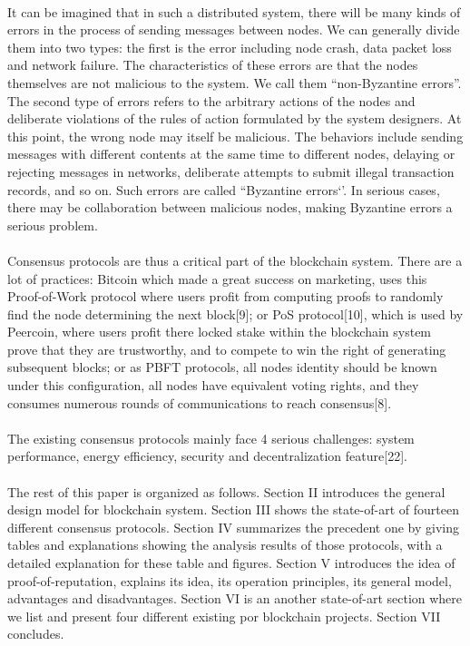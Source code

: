\documentclass[doublespacing]{bmcart}
\begin{document}
\begin{CJK*}{UTF8}{gbsn}
\paragraph{}


It can be imagined that in such a distributed system, there will be many kinds of errors in the process of sending messages between nodes. We can generally divide them into two types: the first is the error including node crash, data packet loss and network failure. The characteristics of these errors are that the nodes themselves are not malicious to the system. We call them ``non-Byzantine errors''. The second type of errors refers to the arbitrary actions of the nodes and deliberate violations of the rules of action formulated by the system designers. At this point, the wrong node may itself be malicious. The behaviors include sending messages with different contents at the same time to different nodes, delaying or rejecting messages in networks, deliberate attempts to submit illegal transaction records, and so on. Such errors are called ``Byzantine errors‘’. In serious cases, there may be collaboration between malicious nodes, making Byzantine errors a serious problem.
\paragraph{}
	Consensus protocols are thus a critical part of the blockchain system. There are a lot of practices: Bitcoin which made a great success on marketing, uses this Proof-of-Work protocol where users profit from computing proofs to randomly find the node determining the next block[9]; or PoS protocol[10], which is used by Peercoin, where users profit there locked stake within the blockchain system prove that they are trustworthy, and to compete to win the right of generating subsequent blocks; or as PBFT protocols, all nodes identity should be known under this configuration, all nodes have equivalent voting rights, and they consumes numerous rounds of communications to reach consensus[8].
	\paragraph{} 
	The existing consensus protocols mainly face 4 serious challenges: system performance, energy efficiency, security and decentralization feature[22].
\paragraph{} The rest of this paper is organized as follows. Section II introduces the general design model for blockchain system. Section III shows the state-of-art of fourteen different consensus protocols. Section IV summarizes the precedent one by giving tables and explanations showing the analysis results of those protocols, with a detailed explanation for these table and figures. Section V introduces the idea of proof-of-reputation, explains its idea, its operation principles, its general model, advantages and disadvantages. Section VI is an another state-of-art section where we list and present four different existing por blockchain projects. %
 Section VII concludes.

\end{CJK*}
\end{document}
